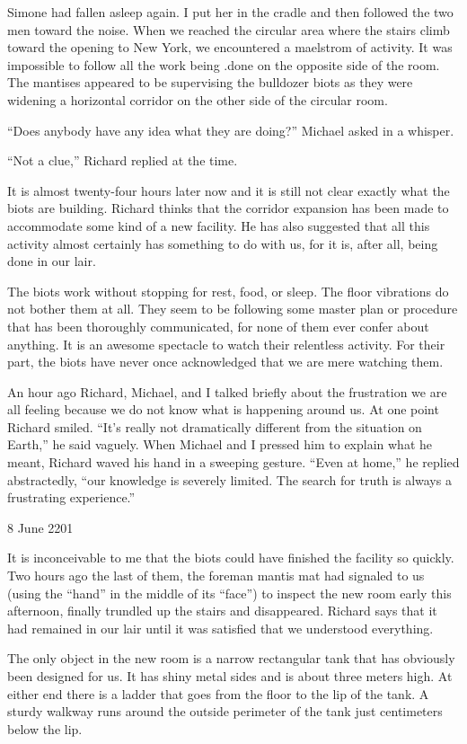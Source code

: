 \documentclass[]{article}
\begin{document}
Simone had fallen asleep again.  I put her in the cradle and then followed the two men toward the noise.  When we reached the circular area where the stairs climb toward the opening to New York, we encountered a maelstrom of activity.  It was impossible to follow all the work being .done on the opposite side of the room.  The mantises appeared to be supervising the bulldozer biots as they were widening a horizontal corridor on the other side of the circular room.

“Does anybody have any idea what they are doing?” Michael asked in a whisper.

“Not a clue,” Richard replied at the time.

It is almost twenty-four hours later now and it is still not clear exactly what the biots are building.  Richard thinks that the corridor expansion has been made to accommodate some kind of a new facility.  He has also suggested that all this activity almost certainly has something to do with us, for it is, after all, being done in our lair.

The biots work without stopping for rest, food, or sleep.  The floor vibrations do not bother them at all.  They seem to be following some master plan or procedure that has been thoroughly communicated, for none of them ever confer about anything.  It is an awesome spectacle to watch their relentless activity.  For their part, the biots have never once acknowledged that we are mere watching them.

An hour ago Richard, Michael, and I talked briefly about the frustration we are all feeling because we do not know what is happening around us.  At one point Richard smiled.  “It’s really not dramatically different from the situation on Earth,” he said vaguely.  When Michael and I pressed him to explain what he meant, Richard waved his hand in a sweeping gesture.  “Even at home,” he replied abstractedly, “our knowledge is severely limited.  The search for truth is always a frustrating experience.”

8 June 2201

It is inconceivable to me that the biots could have finished the facility so quickly.  Two hours ago the last of them, the foreman mantis mat had signaled to us (using the “hand” in the middle of its “face”) to inspect the new room early this afternoon, finally trundled up the stairs and disappeared.  Richard says that it had remained in our lair until it was satisfied that we understood everything.

The only object in the new room is a narrow rectangular tank that has obviously been designed for us.  It has shiny metal sides and is about three meters high.  At either end there is a ladder that goes from the floor to the lip of the tank.  A sturdy walkway runs around the outside perimeter of the tank just centimeters below the lip.
\end{document}
